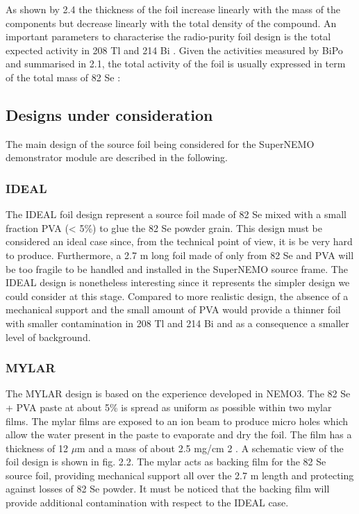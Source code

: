 \documentclass[main.tex]{subfiles}
\begin{document}
\NI As shown by 2.4 the thickness of the foil increase linearly with the mass of the components but decrease linearly with the total density of the compound. An important parameters to characterise the radio-purity foil design is the total expected activity in 208 Tl and 214 Bi . Given the activities measured by BiPo and summarised in 2.1, the total activity of the foil is usually expressed in term of the total mass of 82 Se :


\subsection{Designs under consideration}


\NI The main design of the source foil being considered for the SuperNEMO demonstrator module are described in the following.


\subsubsection{IDEAL}


\NI The IDEAL foil design represent a source foil made of 82 Se mixed with a small fraction PVA (< 5\%) to glue the 82 Se powder grain. This design must be considered an ideal case since, from the technical point of view, it is be very hard to produce. Furthermore, a 2.7 m long foil made of only from 82 Se and PVA will be too fragile to be handled and installed in the SuperNEMO source frame. The IDEAL design is nonetheless interesting since it represents the simpler design we could consider at this stage. Compared to more realistic design, the absence of a mechanical support and the small amount of PVA would provide a thinner foil with smaller contamination in 208 Tl and 214 Bi and as a consequence a smaller level of background.


\subsubsection{MYLAR}


\NI The MYLAR design is based on the experience developed in NEMO3. The 82 Se + PVA paste at about 5\% is spread as uniform as possible within two mylar films. The mylar films are exposed to an ion beam to produce micro holes which allow the water present in the paste to evaporate and dry the foil. The film has a thickness of 12 $\mu$m and a mass of about 2.5 mg/cm 2 . A schematic view of the foil design is shown in fig. 2.2. The mylar acts as backing film for the 82 Se source foil, providing mechanical support all over the 2.7 m length and protecting against losses of 82 Se powder. It must be noticed that the backing film will provide additional contamination with respect to the IDEAL case.
\end{document}
